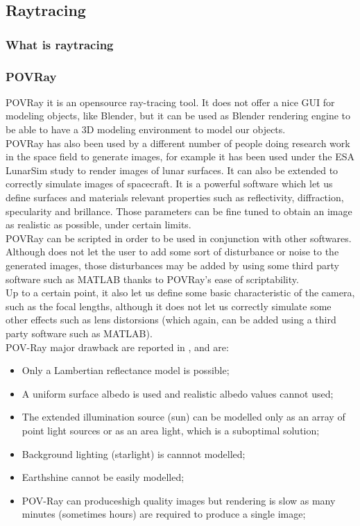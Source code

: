 \subsection{Raytracing}

\subsubsection{What is raytracing}

\subsubsection{POVRay}
POVRay it is an opensource ray-tracing tool. It does not offer a nice GUI for modeling objects, like Blender, but it can be used as Blender rendering engine to be able to have a 3D modeling environment to model our objects. \\
POVRay has also been used by a different number of people doing research work in the space field to generate images, for example it has been used under the ESA LunarSim study to render images of lunar surfaces. It can also be extended to correctly simulate images of spacecraft. It is a powerful software which let us define surfaces and materials relevant properties such as reflectivity, diffraction, specularity and brillance. Those parameters can be fine tuned to obtain an image as realistic as possible, under certain limits.\\
POVRay can be scripted in order to be used in conjunction with other softwares.\\
Although does not let the user to add some sort of disturbance or noise to the generated images, those disturbances may be added by using some third party software such as MATLAB thanks to POVRay's ease of scriptability.\\
Up to a certain point, it also let us define some basic characteristic of the camera, such as the focal lengths, although it does not let us correctly simulate some other effects such as lens distorsions (which again, can be added using a third party software such as MATLAB).\\
POV-Ray major drawback are reported in \cite{pangufinal}, and are:
\begin{itemize}
    \item Only a Lambertian reflectance model is possible;
    \item A uniform surface albedo is used and realistic albedo values cannot used;
    \item The extended illumination source (sun) can be modelled only as an array of point light sources or as an area light, which is a suboptimal solution;
    \item Background lighting (starlight) is cannnot modelled;
    \item Earthshine cannot be easily modelled;
    \item POV-Ray can produceshigh quality images but rendering is slow as many minutes (sometimes hours) are required to produce a single image;
\end{itemize}
